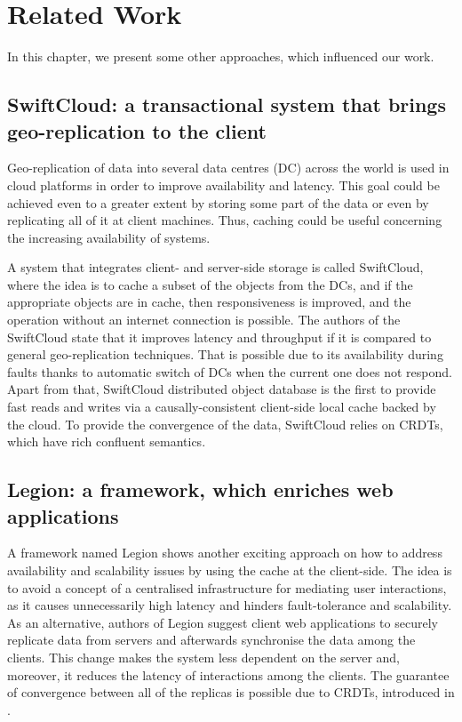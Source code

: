 \chapter{Related Work}
\label{RelatedWork}

In this chapter, we present some other approaches, which influenced our work. 

\section{SwiftCloud: a transactional system that brings geo-replication to the client}

Geo-replication of data into several data centres (DC) across the world is used in cloud platforms in order to improve availability and latency\cite{6}. This goal could be achieved even to a greater extent by storing some part of the data or even by replicating all of it at client machines. Thus, caching could be useful concerning the increasing availability of systems.

A system that integrates client- and server-side storage is called SwiftCloud, where the idea is to cache a subset of the objects from the DCs, and if the appropriate objects are in cache, then responsiveness is improved, and the operation without an internet connection is possible\cite{5}. The authors of the SwiftCloud state that it improves latency and throughput if it is compared to general geo-replication techniques. That is possible due to its availability during faults thanks to automatic switch of DCs when the current one does not respond. Apart from that, SwiftCloud distributed object database is the first to provide fast reads and writes via a causally-consistent client-side local cache backed by the cloud. To provide the convergence of the data, SwiftCloud relies on CRDTs, which have rich confluent semantics\cite{7}.

\section{Legion: a framework, which enriches web applications}

A framework named Legion shows another exciting approach on how to address availability and scalability issues by using the cache at the client-side. The idea is to avoid a concept of a centralised infrastructure for mediating user interactions, as it causes unnecessarily high latency and hinders fault-tolerance and scalability\cite{8}. As an alternative, authors of Legion suggest client web applications to securely replicate data from servers and afterwards synchronise the data among the clients. This change makes the system less dependent on the server and, moreover, it reduces the latency of interactions among the clients. The guarantee of convergence between all of the replicas is possible due to CRDTs, introduced in . 

